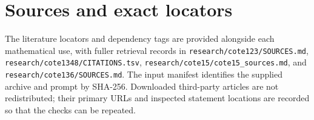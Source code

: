 \documentclass[11pt,a4paper]{article}
\begin{document}
\section{Sources and exact locators}
The literature locators and dependency tags are provided alongside
each mathematical use, with fuller retrieval records in
\nolinkurl{research/cote123/SOURCES.md},
\nolinkurl{research/cote1348/CITATIONS.tsv},
\texttt{research/cote15/cote15\_sources.md}, and
\texttt{research/cote136/SOURCES.md}. The input manifest identifies the
supplied archive and prompt by SHA-256. Downloaded third-party articles
are not redistributed; their primary URLs and inspected statement
locations are recorded so that the checks can be repeated.
\end{document}
